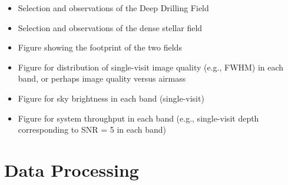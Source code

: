 \begin{itemize}

\item Selection and observations of the Deep Drilling Field

\item Selection and observations of the dense stellar field

\item Figure showing the footprint of the two fields

\item Figure for distribution of single-visit image quality (e.g., FWHM) in each band, or perhaps image quality versus airmass

\item Figure for sky brightness in each band (single-visit) 

\item Figure for system throughput in each band (e.g., single-visit depth corresponding to SNR = 5 in each band)

\end{itemize}








\section{Data Processing}

